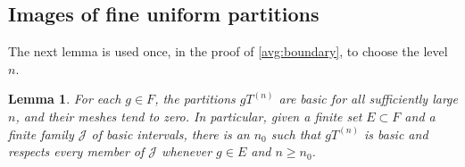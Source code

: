 \documentclass[11pt]{article}
\newtheorem{lemma}[theorem]{Lemma}
\theoremstyle{definition}
\numberwithin{equation}{section}
\begin{document}
\subsection{Images of fine uniform partitions}

The next lemma is used once, in the proof of \cref{avg:boundary}, to choose
the level \(n\).

\begin{lemma}\label{dyad:eventual}
For each \(g\in F\), the partitions \(gT^{(n)}\) are basic for all
sufficiently large \(n\), and their meshes tend to zero. In particular,
given a finite set \(E\subset F\) and a finite family \(\mathcal J\) of
basic intervals, there is an \(n_0\) such that \(gT^{(n)}\) is basic and
respects every member of \(\mathcal J\) whenever \(g\in E\) and
\(n\ge n_0\).
\end{lemma}
\end{document}
